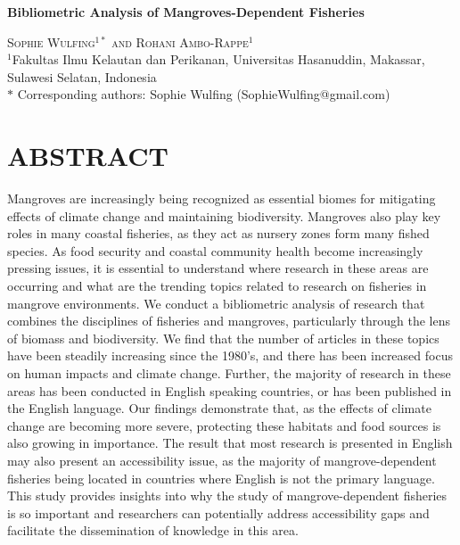 \documentclass[
  12pt,
]{article}
\author{}
\date{\vspace{-2.5em}}
\begin{document}
\doublespacing

\begin{center}
    
\textbf{\Large Bibliometric Analysis of Mangroves-Dependent Fisheries}
    
\textsc{Sophie Wulfing$^{1*}$ and Rohani Ambo-Rappe$^{1}$\\}
\vspace{3 mm}
\normalsize{\indent $^1$Fakultas Ilmu Kelautan dan Perikanan, Universitas Hasanuddin, Makassar, Sulawesi Selatan, Indonesia\\}
$\text{*}$ Corresponding authors: Sophie Wulfing (SophieWulfing@gmail.com)
\end{center}

\newpage

\linenumbers

\section*{ABSTRACT}\label{abstract}

Mangroves are increasingly being recognized as essential biomes for mitigating effects of climate change and maintaining biodiversity. Mangroves also play key roles in many coastal fisheries, as they act as nursery zones form many fished species. As food security and coastal community health become increasingly pressing issues, it is essential to understand where research in these areas are occurring and what are the trending topics related to research on fisheries in mangrove environments. We conduct a bibliometric analysis of research that combines the disciplines of fisheries and mangroves, particularly through the lens of biomass and biodiversity. We find that the number of articles in these topics have been steadily increasing since the 1980's, and there has been increased focus on human impacts and climate change. Further, the majority of research in these areas has been conducted in English speaking countries, or has been published in the English language. Our findings demonstrate that, as the effects of climate change are becoming more severe, protecting these habitats and food sources is also growing in importance. The result that most research is presented in English may also present an accessibility issue, as the majority of mangrove-dependent fisheries being located in countries where English is not the primary language. This study provides insights into why the study of mangrove-dependent fisheries is so important and researchers can potentially address accessibility gaps and facilitate the dissemination of knowledge in this area.
\end{document}
